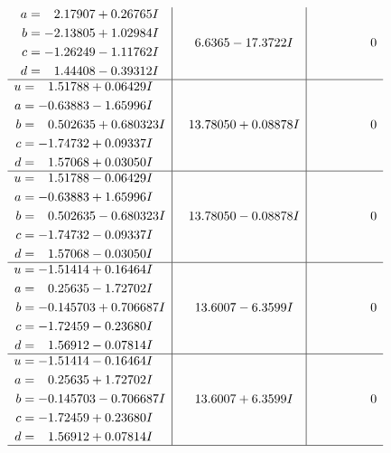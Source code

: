 \documentclass[1p]{elsarticle_modified}
\theoremstyle{definition}
\begin{document}
$$\begin{array}{c|c|c}
\begin{aligned}
a &= \phantom{-}2.17907 + 0.26765 I \\
b &= -2.13805 + 1.02984 I \\
c &= -1.26249 - 1.11762 I \\
d &= \phantom{-}1.44408 - 0.39312 I\end{aligned}
 & \phantom{-}6.6365 - 17.3722 I & \phantom{-0.000000 } 0 \\ \hline\begin{aligned}
u &= \phantom{-}1.51788 + 0.06429 I \\
a &= -0.63883 - 1.65996 I \\
b &= \phantom{-}0.502635 + 0.680323 I \\
c &= -1.74732 + 0.09337 I \\
d &= \phantom{-}1.57068 + 0.03050 I\end{aligned}
 & \phantom{-}13.78050 + 0.08878 I & \phantom{-0.000000 } 0 \\ \hline\begin{aligned}
u &= \phantom{-}1.51788 - 0.06429 I \\
a &= -0.63883 + 1.65996 I \\
b &= \phantom{-}0.502635 - 0.680323 I \\
c &= -1.74732 - 0.09337 I \\
d &= \phantom{-}1.57068 - 0.03050 I\end{aligned}
 & \phantom{-}13.78050 - 0.08878 I & \phantom{-0.000000 } 0 \\ \hline\begin{aligned}
u &= -1.51414 + 0.16464 I \\
a &= \phantom{-}0.25635 - 1.72702 I \\
b &= -0.145703 + 0.706687 I \\
c &= -1.72459 - 0.23680 I \\
d &= \phantom{-}1.56912 - 0.07814 I\end{aligned}
 & \phantom{-}13.6007 - 6.3599 I & \phantom{-0.000000 } 0 \\ \hline\begin{aligned}
u &= -1.51414 - 0.16464 I \\
a &= \phantom{-}0.25635 + 1.72702 I \\
b &= -0.145703 - 0.706687 I \\
c &= -1.72459 + 0.23680 I \\
d &= \phantom{-}1.56912 + 0.07814 I\end{aligned}
 & \phantom{-}13.6007 + 6.3599 I & \phantom{-0.000000 } 0\\
 \hline 
 \end{array}$$\newpage\newpage\renewcommand{\arraystretch}{1}
\end{document}
